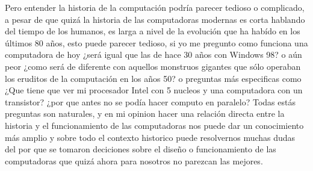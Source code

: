 \documentclass[letterpaper,12pt,oneside]{book}
\begin{document}
	Pero entender la historia de la computación podría parecer tedioso o complicado, 
	 a pesar de que quizá la historia de las computadoras modernas es corta hablando del tiempo
	de los humanos, es larga a nivel de la evolución que ha habído en los últimos 80 años, esto puede parecer tedioso, si yo me pregunto como funciona una computadora
	de hoy ¿será igual que las de hace 30 años con Windows 98? o aún peor ¿como será de diferente con aquellos monstruos gigantes que sólo operaban los eruditos
	de la computación en los años 50? o preguntas más especificas como  ¿Que tiene que ver mi procesador Intel con 5 nucleos y una computadora con un transistor? ¿por que 	
	antes no se podía hacer computo en paralelo? Todas estás preguntas son naturales, y en mi opinion hacer una relación directa entre la historia y el funcionamiento de
	las computadoras nos puede dar un conocimiento más amplio y sobre todo el contexto historico puede resolvernos
	muchas dudas del por que se tomaron deciciones sobre el diseño o funcionamiento de las computadoras que quizá ahora para nosotros no parezcan las mejores.
	
\end{document}
